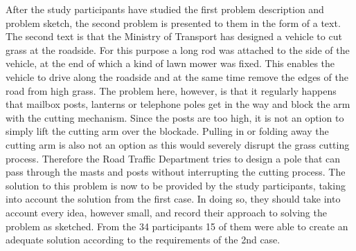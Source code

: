 \documentclass[12pt]{article}
\begin{document}
After the study participants have studied the first problem description and problem sketch, the second problem is presented to them in the form of a text. 
The second text is that the Ministry of Transport has designed a vehicle to cut grass at the roadside. For this purpose a long rod was attached to the side of the vehicle, at the end of which a kind of lawn mower was fixed. This enables the vehicle to drive along the roadside and at the same time remove the edges of the road from high grass. The problem here, however, is that it regularly happens that mailbox posts, lanterns or telephone poles get in the way and block the arm with the cutting mechanism. Since the posts are too high, it is not an option to simply lift the cutting arm over the blockade. Pulling in or folding away the cutting arm is also not an option as this would severely disrupt the grass cutting process. Therefore the Road Traffic Department tries to design a pole that can pass through the masts and posts without interrupting the cutting process. The solution to this problem is now to be provided by the study participants, taking into account the solution from the first case. In doing so, they should take into account every idea, however small, and record their approach to solving the problem as sketched.  From the 34 participants 15 of them were able to create an adequate solution according to the requirements of the 2nd case. 
\end{document}
